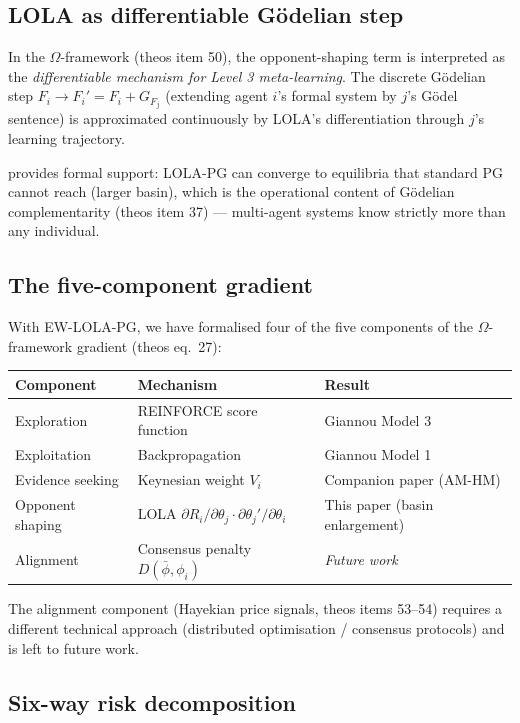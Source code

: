 \documentclass[11pt,a4paper]{article}
\begin{document}
\subsection{LOLA as differentiable Gödelian step}

In the $\Omega$-framework (theos item 50), the opponent-shaping term is interpreted as the \emph{differentiable mechanism for Level 3 meta-learning}. The discrete Gödelian step $F_i \to F_i' = F_i + G_{F_j}$ (extending agent $i$'s formal system by $j$'s Gödel sentence) is approximated continuously by LOLA's differentiation through $j$'s learning trajectory.

 provides formal support: LOLA-PG can converge to equilibria that standard PG cannot reach (larger basin), which is the operational content of Gödelian complementarity (theos item 37) --- multi-agent systems know strictly more than any individual.

\subsection{The five-component gradient}

With EW-LOLA-PG, we have formalised four of the five components of the $\Omega$-framework gradient (theos eq.\ 27):

\begin{center}
\renewcommand{\arraystretch}{1.3}
\begin{tabular}{lll}
\hline
\textbf{Component} & \textbf{Mechanism} & \textbf{Result} \\
\hline
Exploration & REINFORCE score function & Giannou Model 3 \\
Exploitation & Backpropagation & Giannou Model 1 \\
Evidence seeking & Keynesian weight $V_i$ & Companion paper (AM-HM) \\
Opponent shaping & LOLA $\partial R_i/\partial\theta_j \cdot \partial\theta_j'/\partial\theta_i$ & This paper (basin enlargement) \\
Alignment & Consensus penalty $D(\bar{\phi}, \phi_i)$ & \emph{Future work} \\
\hline
\end{tabular}
\end{center}

The alignment component (Hayekian price signals, theos items 53--54) requires a different technical approach (distributed optimisation / consensus protocols) and is left to future work.

\subsection{Six-way risk decomposition}
\end{document}

